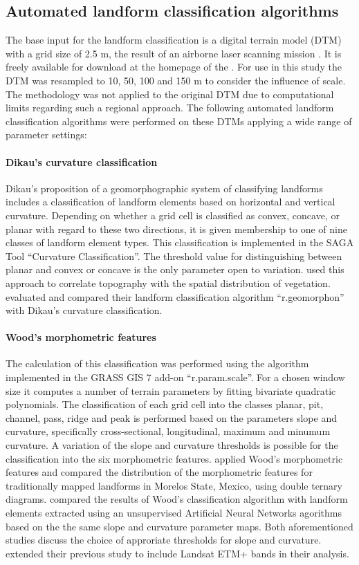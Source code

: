 \documentclass[preprint,12pt,authoryear]{elsarticle}
\begin{document}
\subsection{Automated landform classification algorithms}
The base input for the landform classification is a digital terrain model (DTM) with a grid size of 2.5 m, the result of an airborne laser scanning mission \citep{Wack2005}. It is freely available for download at the homepage of the \cite{DTM}. For use in this study the DTM was resampled to 10, 50, 100 and 150 m to consider the influence of scale. The methodology was not applied to the original DTM due to computational limits regarding such a regional approach. The following automated landform classification algorithms were performed on these DTMs applying a wide range of parameter settings:
\paragraph{Dikau's curvature classification \citep{Dikau1988}}
Dikau's proposition of a geomorphographic system of classifying landforms includes a classification of landform elements based on horizontal and vertical curvature. Depending on whether a grid cell is classified as convex, concave, or  planar with regard to these two directions, it is given membership to one of nine classes of landform element types. This classification is implemented in the SAGA Tool ``Curvature Classification''. The threshold value for distinguishing between planar and convex or concave is the only parameter open to variation. \cite{Hoersch2002} used this approach to correlate topography with the spatial distribution of vegetation. \cite{Jasiewicz2013} evaluated and compared their landform classification algorithm ``r.geomorphon'' with Dikau's curvature classification.
\paragraph{Wood's morphometric features \citep{Wood1996}}
The calculation of this classification was performed using the algorithm implemented in the GRASS GIS 7  add-on ``r.param.scale''.  For a chosen window size it computes a number of terrain parameters by fitting bivariate quadratic polynomials.  The classification of each grid cell into the classes planar, pit, channel, pass, ridge and peak is performed based on the parameters slope and curvature, specifically cross-sectional, longitudinal, maximum and minumum curvature. A variation of  the slope and curvature thresholds is possible for the classification into the six morphometric features.
\cite{Bolongaro-Crevenna2005} applied Wood's morphometric features and compared the distribution of the morphometric features for traditionally mapped landforms in Morelos State, Mexico, using double ternary diagrams. \cite{Ehsani2008} compared the results of Wood's classification algorithm with landform elements extracted using  an unsupervised Artificial Neural Networks agorithms based on the the same slope and curvature parameter maps. Both aforementioned studies discuss the choice of approriate thresholds for slope and curvature. \cite{Ehsani2009} extended their previous study  to include Landsat ETM+ bands in their analysis.  
\end{document}
